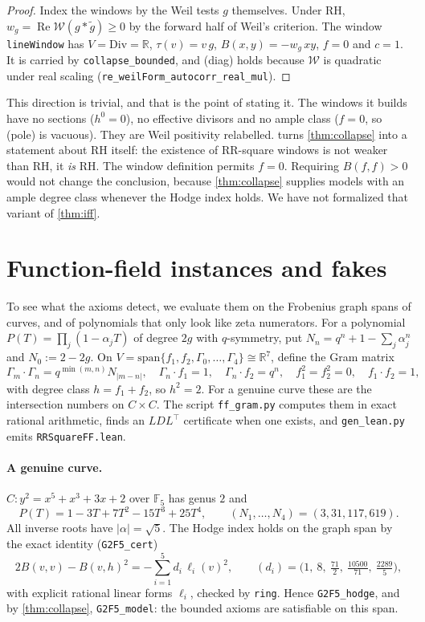\documentclass[11pt]{article}
\theoremstyle{definition}
\newcommand{\lean}[1]{\texttt{#1}}
\newcommand{\re}{\operatorname{Re}}
\newcommand{\R}{\mathbb{R}}
\newcommand{\F}{\mathbb{F}}
\newcommand{\Div}{\mathrm{Div}}
\newcommand{\Weil}{\mathcal{W}}
\begin{document}
\begin{proof}
Index the windows by the Weil tests $g$ themselves. Under RH, $w_g = \re\Weil(g*\tilde g) \ge 0$ by the forward half of Weil's criterion. The window \lean{lineWindow} has $V = \Div = \R$, $\tau(v) = v\,g$, $B(x,y) = -w_g\,xy$, $f = 0$ and $c = 1$. It is carried by \lean{collapse\_bounded}, and (diag) holds because $\Weil$ is quadratic under real scaling (\lean{re\_weilForm\_autocorr\_real\_mul}).
\end{proof}

This direction is trivial, and that is the point of stating it. The windows it builds have no sections ($h^0 = 0$), no effective divisors and no ample class ($f = 0$, so (pole) is vacuous). They are Weil positivity relabelled.  turns \cref{thm:collapse} into a statement about RH itself: the existence of RR-square windows is not weaker than RH, it \emph{is} RH. The window definition permits $f = 0$. Requiring $B(f,f) > 0$ would not change the conclusion, because \cref{thm:collapse} supplies models with an ample degree class whenever the Hodge index holds. We have not formalized that variant of \cref{thm:iff}.

\section{Function-field instances and fakes}\label{sec:ff}

To see what the axioms detect, we evaluate them on the Frobenius graph spans of curves, and of polynomials that only look like zeta numerators. For a polynomial $P(T) = \prod_{j}(1-\alpha_j T)$ of degree $2g$ with $q$-symmetry, put $N_n = q^n + 1 - \sum_j \alpha_j^n$ and $N_0 := 2 - 2g$. On $V = \mathrm{span}\{f_1, f_2, \Gamma_0,\dots,\Gamma_4\}\cong\R^7$, define the Gram matrix
\[
\Gamma_m\cdot\Gamma_n = q^{\min(m,n)} N_{|m-n|},\quad \Gamma_n\cdot f_1 = 1,\quad \Gamma_n\cdot f_2 = q^n,\quad f_1^2 = f_2^2 = 0,\quad f_1\cdot f_2 = 1,
\]
with degree class $h = f_1+f_2$, so $h^2 = 2$. For a genuine curve these are the intersection numbers on $C\times C$. The script \lean{ff\_gram.py} computes them in exact rational arithmetic, finds an $LDL^\top$ certificate when one exists, and \lean{gen\_lean.py} emits \lean{RRSquareFF.lean}.

\paragraph{A genuine curve.} $C : y^2 = x^5 + x^3 + 3x + 2$ over $\F_5$ has genus $2$ and
\[
P(T) = 1 - 3T + 7T^2 - 15T^3 + 25T^4, \qquad (N_1,\dots,N_4) = (3, 31, 117, 619).
\]
All inverse roots have $|\alpha| = \sqrt5$. The Hodge index holds on the graph span by the exact identity (\lean{G2F5\_cert})
\[
2B(v,v) - B(v,h)^2 = -\sum_{i=1}^{5} d_i\,\ell_i(v)^2,\qquad (d_i) = \bigl(1,\ 8,\ \tfrac{71}{2},\ \tfrac{10500}{71},\ \tfrac{2289}{5}\bigr),
\]
with explicit rational linear forms $\ell_i$, checked by \lean{ring}. Hence \lean{G2F5\_hodge}, and by \cref{thm:collapse}, \lean{G2F5\_model}: the bounded axioms are satisfiable on this span.
\end{document}

